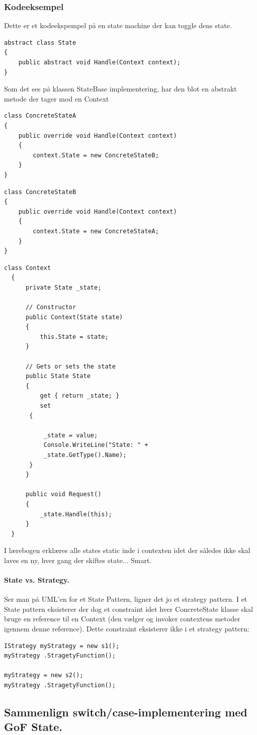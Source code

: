 \subsubsection{Kodeeksempel}

Dette er et kodeekspempel på en state machine der kan toggle dens state.

\begin{lstlisting}[caption=StateBase klassen]
abstract class State
{
	public abstract void Handle(Context context);
}
\end{lstlisting}

Som det ses på klassen StateBase implementering, har den blot en abstrakt metode der tager mod en Context

\begin{lstlisting}[caption=ConcreteStateA klassen - Switcher til State B]
class ConcreteStateA
{
	public override void Handle(Context context)
	{
		context.State = new ConcreteStateB;
	}
}
\end{lstlisting}

\begin{lstlisting}[caption=StateBase klassen - Switcher til state A]
class ConcreteStateB
{
	public override void Handle(Context context)
	{
		context.State = new ConcreteStateA;
	}
}
\end{lstlisting}


\begin{lstlisting}[caption=Context klassen - Bruges i main() til at kalde Request()]
  class Context
  {
	  private State _state;
  
	  // Constructor
	  public Context(State state)
	  {
		  this.State = state;
	  }
  
	  // Gets or sets the state
	  public State State
	  {
		  get { return _state; }
		  set
	   {
	  
		   _state = value;
		   Console.WriteLine("State: " +
		   _state.GetType().Name);
	   }
	  }
  
	  public void Request()
	  {
		  _state.Handle(this);
	  }
  }
\end{lstlisting}
\newpage

I lærebogen erklæres alle states static inde i contexten idet der således ikke skal laves en ny, hver gang der skiftes state... Smart.


\paragraph{State vs. Strategy.}
Ser man på UML'en for et State Pattern, ligner det jo et strategy pattern. I et State  pattern eksisterer der dog et constraint idet hver ConcreteState klasse skal bruge en reference til en Context (den vælger og invoker contextens metoder igennem denne reference). Dette constraint eksisterer ikke i et strategy pattern:

\begin{lstlisting}[caption=Klients brug af strategy pattern]
IStrategy myStrategy = new s1();
myStrategy .StragetyFunction();

myStrategy = new s2();
myStrategy .StragetyFunction();
\end{lstlisting}


\subsection{Sammenlign switch/case-implementering med GoF State.}


